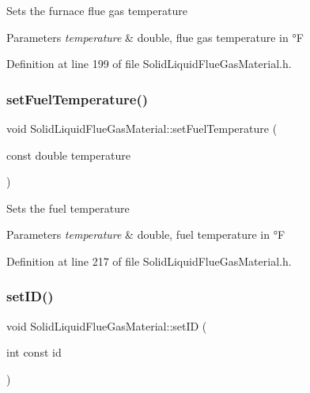 Sets the furnace flue gas temperature 
\begin{DoxyParams}{Parameters}
{\em temperature} & double, flue gas temperature in °F \\
\hline
\end{DoxyParams}


Definition at line 199 of file Solid\+Liquid\+Flue\+Gas\+Material.\+h.

\mbox{\label{class_solid_liquid_flue_gas_material_a420ba1234c5f8c4b93f190b61046a589}} 
\subsubsection{\texorpdfstring{set\+Fuel\+Temperature()}{setFuelTemperature()}}
{\footnotesize\ttfamily void Solid\+Liquid\+Flue\+Gas\+Material\+::set\+Fuel\+Temperature (\begin{DoxyParamCaption}\item[{const double}]{temperature }\end{DoxyParamCaption})\hspace{0.3cm}{\ttfamily [inline]}}

Sets the fuel temperature 
\begin{DoxyParams}{Parameters}
{\em temperature} & double, fuel temperature in °F \\
\hline
\end{DoxyParams}


Definition at line 217 of file Solid\+Liquid\+Flue\+Gas\+Material.\+h.

\mbox{\label{class_solid_liquid_flue_gas_material_a6046d06703bd496745121b62eab4f40f}} 
\subsubsection{\texorpdfstring{set\+I\+D()}{setID()}}
{\footnotesize\ttfamily void Solid\+Liquid\+Flue\+Gas\+Material\+::set\+ID (\begin{DoxyParamCaption}\item[{int const}]{id }\end{DoxyParamCaption})\hspace{0.3cm}{\ttfamily [inline]}}

